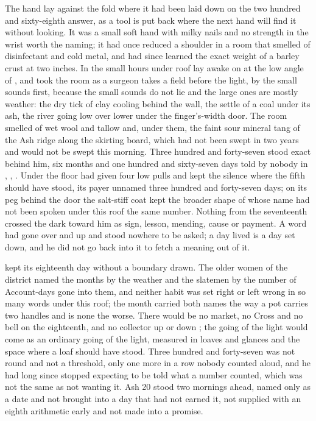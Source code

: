 
The hand lay against the fold where it had been laid down on the two hundred and sixty-eighth answer, as a tool is put back where the next hand will find it without looking. It was a small soft hand with milky nails and no strength in the wrist worth the naming; it had once reduced a shoulder in a room that smelled of disinfectant and cold metal, and had since learned the exact weight of a barley crust at two inches. In the small hours under  roof  lay awake on  at the low angle of , and took the room as a surgeon takes a field before the light, by the small sounds first, because the small sounds do not lie and the large ones are mostly weather: the dry tick of clay cooling behind the wall, the settle of a coal under its ash, the river going low over lower under the finger's-width door. The room smelled of wet wool and tallow and, under them, the faint sour mineral tang of the Ash ridge along the skirting board, which had not been swept in two years and would not be swept this morning. Three hundred and forty-seven stood exact behind him, six months and one hundred and sixty-seven days told by nobody in , , . Under the floor  had given four low pulls and kept the silence where the fifth should have stood, its payer unnamed three hundred and forty-seven days; on its peg behind the door the salt-stiff coat kept the broader shape of  whose name had not been spoken under this roof the same number. Nothing from the seventeenth crossed the dark toward him as sign, lesson, mending, cause or payment. A word had gone over  and up  and stood nowhere to be asked; a day lived is a day set down, and he did not go back into it to fetch a meaning out of it.

 kept its eighteenth day without a boundary drawn. The older women of the district named the months by the weather and the slatemen by the number of Account-days gone into them, and neither habit was set right or left wrong in so many words under this roof; the month carried both names the way a pot carries two handles and is none the worse. There would be no market, no Cross and no bell on the eighteenth, and no collector up or down ; the going of the light would come as an ordinary going of the light, measured in loaves and glances and the space where a loaf should have stood. Three hundred and forty-seven was not round and not a threshold, only one more in a row nobody counted aloud, and he had long since stopped expecting to be told what a number counted, which was not the same as not wanting it. Ash 20 stood two mornings ahead, named only as a date and not brought into a day that had not earned it, not supplied with an eighth arithmetic early and not made into a promise.

